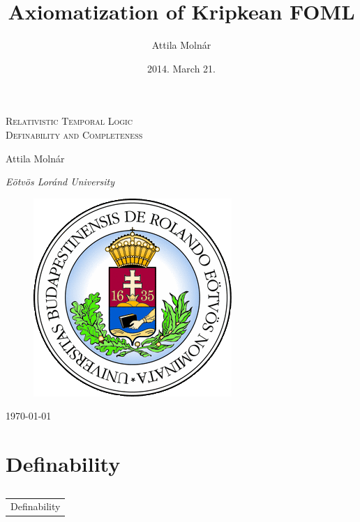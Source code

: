 \documentclass[xcolor=x11names]{beamer}
\author{Attila Moln\'ar}
\date{2014. March 21.}
\title{Axiomatization of Kripkean FOML}
\institute{ELTE}
\makeatletter
\let\beamer@writeslidentry@miniframeson=\beamer@writeslidentry
\def\beamer@writeslidentry@miniframesoff{%
  \expandafter\beamer@ifempty\expandafter{\beamer@framestartpage}{}%
  {%
    \clearpage\beamer@notesactions%
  }
}
\newcommand*{\miniframeson}{\let\beamer@writeslidentry=\beamer@writeslidentry@miniframeson}
\newcommand*{\miniframesoff}{\let\beamer@writeslidentry=\beamer@writeslidentry@miniframesoff}
\newcommand{\cimdia}[1] {\miniframesoff \begin{frame}\begin{center}\huge \begin{tabular}{c}#1\end{tabular}\end{center}\end{frame}\miniframeson}
\newcommand{\szakasz}[2][]{\section{#1}\subsection{}\cimdia{#2}}
\makeatother
\begin{document}
\footnotesize


\begin{frame}
\centering
\textsc{\Large Relativistic Temporal Logic \\[1em] Definability and Completeness}

\bigskip

{ \small Attila Moln\'ar

    \textit{E\"otv\"os Lor\'and University}}

 \begin{figure}
\includegraphics[scale=.3]{elte_cimer.png}
 \end{figure}

	\today
\end{frame}


\szakasz[Definability]{Definability}
\end{document}
